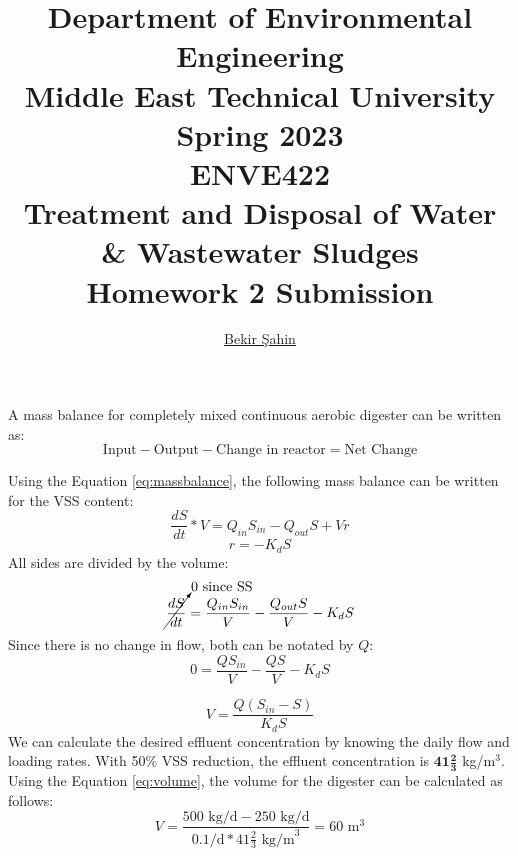 \documentclass[a4paper]{article}
\title{Department of Environmental Engineering\\Middle East Technical University\\Spring 2023\\ENVE422\\Treatment and Disposal of Water \& Wastewater Sludges\\Homework 2 Submission} %
\author{\href{sahin.bekir@metu.edu.tr}{Bekir Şahin}} %
\begin{document}
\setcounter{page}{0}
\onehalfspacing
\maketitle %
\thispagestyle{empty}
\newpage
\section{}
A mass balance for completely mixed continuous aerobic digester \autocite{metcalf2014} can be written as:
\begin{equation}
    \text{Input} - \text{Output} - \text{Change in reactor} = \text{Net Change} \label{eq:massbalance}
\end{equation}
\begin{minipage}[c]{0.5\textwidth}
Using the Equation \ref{eq:massbalance}, the following mass balance can be written for the VSS content:
$$\frac{dS}{dt}*V = Q_{in} S_{in} - Q_{out} S + V r$$
$$r = -K_dS$$
All sides are divided by the volume:
$$\cancelto{\text{0 since SS}}{\frac{dS}{dt}} = \frac{Q_{in} S_{in}}{V} - \frac{Q_{out} S}{V} - K_dS$$
Since there is no change in flow, both can be notated by $Q$:
$$0 = \frac{Q S_{in}}{V} - \frac{Q S}{V} - K_d S$$
\end{minipage}
\hfill
\begin{minipage}{0.4\textwidth}
\end{minipage}
\begin{equation}
    V = \frac{Q (S_{in} -  S)}{K_d S } \label{eq:volume}
\end{equation}
We can calculate the desired effluent concentration by knowing the daily flow and loading rates. With 50\% VSS reduction, the effluent concentration is $\mathbf{41\frac{2}{3}}$ kg/m$^3$. Using the Equation \ref{eq:volume}, the volume for the digester can be calculated as follows:
$$V=\frac{500\text{ kg/d}-250\text{ kg/d}}{0.1\text{/d}*41\frac{2}{3}\text{ kg/m}^3}=\boxed{60 \text{ m}^3}$$
\section{}
\end{document}
